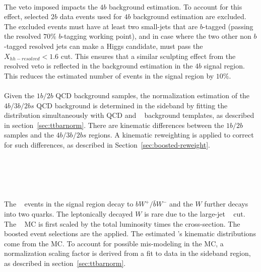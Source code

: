 \paragraph{} 
The veto imposed impacts the $4b$ background estimation. 
To account for this effect, selected $2b$ data events used for $4b$ background estimation are excluded.
The excluded events must have at least two small-\R jets that are $b$-tagged (passing the resolved $70\%$ $b$-tagging working point), and in case where the two other non $b$-tagged resolved jets can make a Higgs candidate, must pass the $X_{hh-resolved} < 1.6$ cut.
This ensures that a similar sculpting effect from the resolved veto is reflected in the background estimation in the $4b$ signal region.
This reduces the estimated number of events in the signal region by $10\%$.

\paragraph{}
Given the $1b/2b$ QCD background samples, the normalization estimation of the $4b/3b/2bs$ QCD background is determined in the sideband by fitting the \mleadJ~ distribution simultaneously with QCD and \ttbar~ background templates, as described in section~\ref{sec:ttbarnorm}.
There are kinematic differences between the $1b/2b$ samples and the $4b/3b/2bs$ regions.  
A kinematic reweighting is applied to correct for such differences, as described in Section~\ref{sec:boosted-reweight}.


\section{\ttbar~}
\label{sec:boosted-ttbar}

\paragraph{}
The \ttbar~ events in the signal region decay to $bW^{+}/\bar{b}W^{-}$ and the $W$ further decays into two quarks.
The leptonically decayed $W$ is rare due to the large-\R jet \pt~ cut.
The \ttbar~ MC is first scaled by the total luminosity times the cross-section.
The boosted event selections are the applied.
The estimated \ttbar's kinematic distributions come from the MC.
To account for possible mis-modeling in the MC, a normalization scaling factor is derived from a fit to data in the sideband region, as described in section~\ref{sec:ttbarnorm}.

